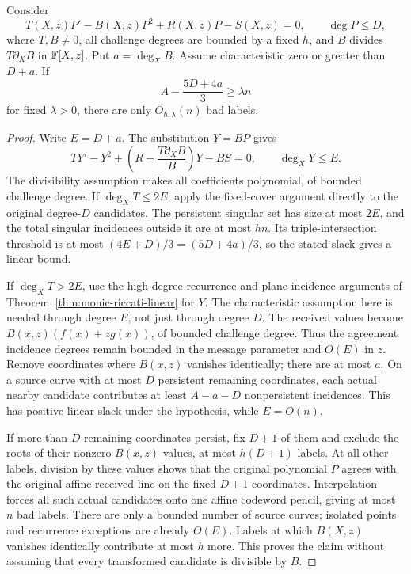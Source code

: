 \begin{corollary}
\label{cor:riccati-polynomial-gauge}
Consider
\[
 T(X,z)P'-B(X,z)P^2+R(X,z)P-S(X,z)=0,
 \qquad \deg P\le D,
\]
where $T,B\ne0$, all challenge degrees are bounded by a fixed $h$,
and $B$ divides $T\partial_XB$ in $\mathbb F[X,z]$. Put $a=\deg_XB$.
Assume characteristic zero or greater than $D+a$. If
\[
 A-\frac{5D+4a}{3}\ge\lambda n
\]
for fixed $\lambda>0$, there are only $O_{h,\lambda}(n)$ bad labels.
\end{corollary}
\begin{proof}
Write $E=D+a$. The substitution $Y=BP$ gives
\[
 TY'-Y^2+\left(R-\frac{T\partial_XB}{B}\right)Y-BS=0,
 \qquad \deg_XY\le E.
\]
The divisibility assumption makes all coefficients polynomial, of bounded
challenge degree. If $\deg_XT\le2E$, apply the fixed-cover argument directly
to the original degree-$D$ candidates. The persistent singular set has
size at most $2E$, and the total singular incidences outside it are at
most $hn$. Its triple-intersection threshold is at most
$(4E+D)/3=(5D+4a)/3$, so the stated slack gives a linear bound.

If $\deg_XT>2E$, use the high-degree recurrence and plane-incidence
arguments of Theorem~\ref{thm:monic-riccati-linear} for $Y$. The
characteristic assumption here is needed through degree $E$, not just
through degree $D$. The received values become
$B(x,z)(f(x)+zg(x))$, of bounded challenge degree. Thus the agreement
incidence degrees remain bounded in the message parameter and $O(E)$
in $z$. Remove coordinates where $B(x,z)$ vanishes identically; there
are at most $a$. On a source curve with at most $D$ persistent remaining
coordinates, each actual nearby candidate contributes at least $A-a-D$
nonpersistent incidences. This has positive linear slack under the
hypothesis, while $E=O(n)$.

If more than $D$ remaining coordinates persist, fix $D+1$ of them and
exclude the roots of their nonzero $B(x,z)$ values, at most $h(D+1)$
labels. At all other labels, division by these values shows that the
original polynomial $P$ agrees with the original affine received line
on the fixed $D+1$ coordinates. Interpolation forces all such actual
candidates onto one affine codeword pencil, giving at most $n$ bad labels.
There are only a bounded number of source curves; isolated points and
recurrence exceptions are already $O(E)$. Labels at which $B(X,z)$
vanishes identically contribute at most $h$ more. This proves the claim
without assuming that every transformed candidate is divisible by $B$.
\end{proof}

